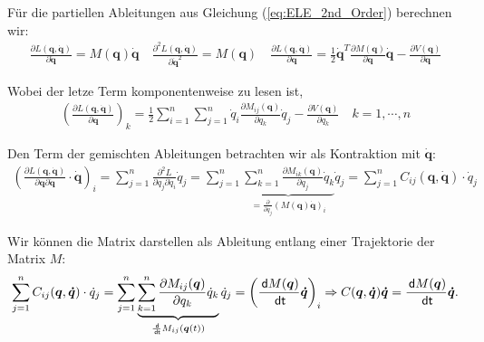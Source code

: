 \documentclass[a4paper, 12pt]{scrartcl}
\newcommand{\dt}{\thinspace \mathsf{dt}}
\newcommand{\dd}{\thinspace \mathsf{d}}
\begin{document}
\begin{beweis}
    Für die partiellen Ableitungen aus Gleichung (\ref{eq:ELE_2nd_Order}) 
    berechnen wir:
    \begin{align*}
        \frac{\partial L(\bm{q},\bm{\dot{q}})}{\partial \bm{\dot{q}}}
        =
        M(\bm{q}) \bm{\dot{q}}
        \quad
        \frac{\partial^2 L(\bm{q},\bm{\dot{q}})}{\partial \bm{\dot{q}}^2}
        =
        M(\bm{q})
        \quad
        \frac{\partial L(\bm{q},\bm{\dot{q}})}{\partial \bm{q}}
        =
        \frac{1}{2} \bm{\dot{q}}^T \frac{\partial M(\bm{q})}{\partial \bm{q}} \bm{\dot{q}}
        - 
        \frac{\partial V(\bm{q})}{\partial \bm{q}}
    \end{align*}

    Wobei der letze Term komponentenweise zu lesen ist,
    \begin{align*}
        \left(
            \frac{\partial L(\bm{q},\bm{\dot{q}})}{\partial \bm{q}}
        \right)_k
        =
        \frac{1}{2} 
        \sum_{i=1}^{n}
            \sum_{j=1}^{n}
                \dot{q}_i 
                \frac{\partial M_{ij}(\bm{q})}{\partial q_k}
                \dot{q}_j 
        -
        \frac{\partial V(\bm{q})}{\partial q_k}
        \quad
        k=1, \cdots , n
    \end{align*}

    Den Term der gemischten Ableitungen betrachten wir als Kontraktion mit $\bm{\dot{q}}$:
    \begin{align*}
        \left(
            \frac{\partial L(\bm{q},\bm{\dot{q}})}{\partial \bm{q} \partial \bm{\dot{q}}}
            \cdot 
            \bm{\dot{q}}
        \right)_i
        =
        \sum_{j=1}^{n} 
        \frac{\partial^2 L}{\partial q_j \partial \dot{q}_i} 
        \dot{q}_j 
        =
        \sum_{j=1}^{n} 
        \underbrace{
            \sum_{k=1}^{n}
            \frac{\partial M_{ik}(\bm{q})}{\partial q_j} \dot{q}_k
        }_{
            = \frac{\partial}{\partial q_j} (M(\bm{q})\bm{\dot{q}})_i
        }
        \dot{q}_j 
        =
        \sum_{j=1}^{n} C_{ij}(\bm{q},\bm{\dot{q}}) \cdot \dot{q}_j
    \end{align*}
\end{beweis}

Wir können die Matrix darstellen als Ableitung entlang einer Trajektorie der Matrix $M$:
\begin{align*}
    \sum_{j=1}^{n} C_{ij}(\bm{q},\bm{\dot{q}}) \cdot \dot{q}_j
    =
    \sum_{j=1}^{n} 
    \underbrace{
        \sum_{k=1}^{n} \frac{\partial M_{ij}(\bm{q})}{\partial q_k} \dot{q}_k
    }_{
        \frac{\dd}{\dt} M_{ij}(\bm{q}(t))
    }
    \dot{q}_j 
    =
    \left(\frac{\dd M(\bm{q})}{\dt} \bm{\dot{q}}\right)_i
    \Rightarrow
    C(\bm{q},\bm{\dot{q}}) \bm{\dot{q}} = \frac{\dd M(\bm{q})}{\dt} \bm{\dot{q}}.
\end{align*}
\end{document}
